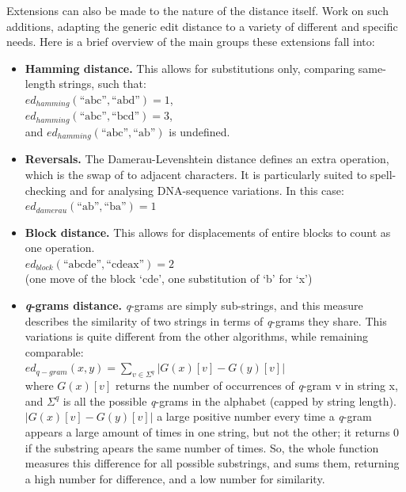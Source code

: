 \documentclass[a4paper,11pt,twoside,notitlepage]{article}
\begin{document}
        Extensions can also be made to the nature of the distance
        itself. Work on such additions, adapting the generic edit
        distance to a variety of different and specific needs. Here is
        a brief overview of the main groups these extensions fall
        into:
        \begin{itemize}
          \item \textbf{Hamming distance.} This allows for
            substitutions only, comparing same-length strings, such
            that:\\ 
            $ed_{hamming}(\text{``abc''},\text{``abd''}) =1$,\\ 
            $ed_{hamming}(\text{``abc''},\text{``bcd''}) = 3$,\\ 
            and $ed_{hamming}(\text{``abc''},\text{``ab''})$ is
            undefined.\cite{Hamming1950}
          \item \textbf{Reversals.} The Damerau-Levenshtein distance
            defines an extra operation, which is the swap of to
            adjacent characters. It is particularly suited to spell-checking
            and for analysing DNA-sequence variations. In this case:\\ 
            $ed_{damerau}(\text{``ab''},\text{``ba''}) = 1$
          \item \textbf{Block distance.} This allows for displacements
            of entire blocks to count as one
            operation.\\
            $ed_{block}(\text{``abcde''},\text{``cdeax''})= 2$ \\
            (one move of the block `cde', one substitution of `b'
            for `x')\cite{Tichy1984}
          \item \textbf{\textit{q}-grams distance.} \textit{q}-grams
            are simply sub-strings, and this measure describes the
            similarity of two strings in terms of \textit{q}-grams
            they share.\cite{Ukkonen1992} This variations is quite
            different from the other algorithms, while remaining
            comparable:\\
            $ed_{q-gram}(x,y)=\sum\limits_{v\in\Sigma ^q}|G(x)[v]-G(y)[v]|$\\ 
            where $G(x)[v]$ returns the number of occurrences of
            \textit{q}-gram v in string x, and $\Sigma ^q$ is all the
            possible \textit{q}-grams in the
            alphabet (capped by string length). $|G(x)[v]-G(y)[v]|$ a
            large positive number every time a \textit{q}-gram appears
            a large amount of times in one string, but not the other;
            it returns 0 if the substring apears the same number of
            times. So, the whole function measures this difference for
            all possible substrings, and sums them, returning a high
            number for difference, and a low number for similarity.
        \end{itemize}
\end{document}
